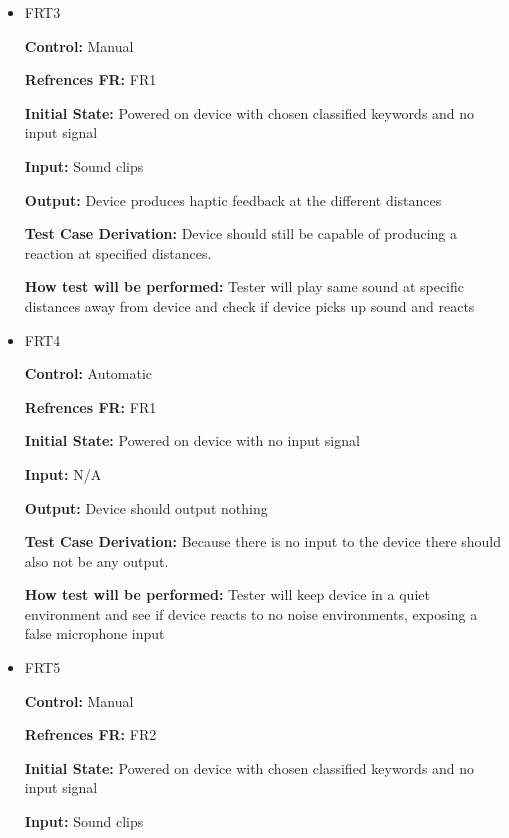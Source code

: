 \documentclass[12pt, titlepage]{article}
\begin{document}
\begin{itemize}
\item{FRT3}

\textbf{Control:} Manual

\textbf{Refrences FR:} FR1 					

\textbf{Initial State:} Powered on device with chosen classified keywords and no input signal 
					
\textbf{Input:} Sound clips
					
\textbf{Output:} Device produces haptic feedback at the different distances

\textbf{Test Case Derivation:} Device should still be capable of producing a reaction at specified distances.
					
\textbf{How test will be performed:}  Tester will play same sound at specific distances away from device and check if device picks up sound and reacts


\item{FRT4}

\textbf{Control:} Automatic

\textbf{Refrences FR:} FR1 					

\textbf{Initial State:} Powered on device with no input signal 
					
\textbf{Input:} N/A
					
\textbf{Output:} Device should output nothing

\textbf{Test Case Derivation:} Because there is no input to the device there should also not be any output.
					
\textbf{How test will be performed:} Tester will keep device in a quiet environment and see if device reacts to no noise environments, exposing a false microphone input 


\item{FRT5}

\textbf{Control:} Manual

\textbf{Refrences FR:} FR2 					

\textbf{Initial State:} Powered on device with chosen classified keywords and no input signal 
					
\textbf{Input:} Sound clips
					

\end{itemize}
\end{document}
